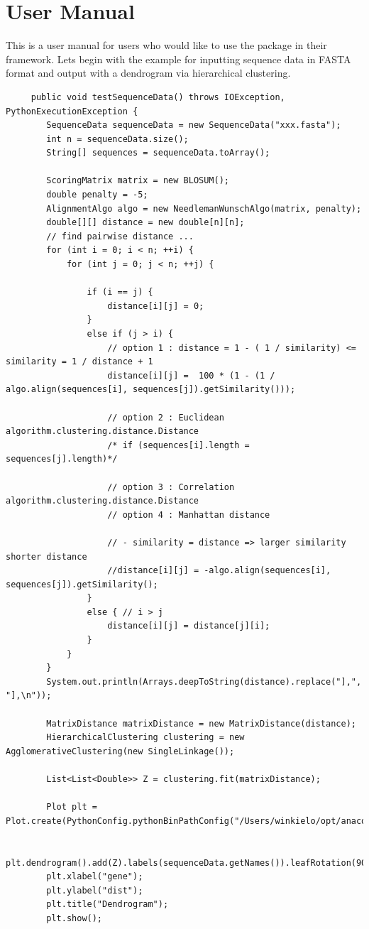 \documentclass[]{final_report}
\begin{document}
\chapter{User Manual}
This is a user manual for users who would like to use the package in their framework. Lets begin with the example for inputting sequence data in FASTA format and output with a dendrogram via hierarchical clustering.

\begin{verbatim}
     public void testSequenceData() throws IOException, PythonExecutionException {
        SequenceData sequenceData = new SequenceData("xxx.fasta");
        int n = sequenceData.size();
        String[] sequences = sequenceData.toArray();

        ScoringMatrix matrix = new BLOSUM();
        double penalty = -5;
        AlignmentAlgo algo = new NeedlemanWunschAlgo(matrix, penalty);
        double[][] distance = new double[n][n];
        // find pairwise distance ...
        for (int i = 0; i < n; ++i) {
            for (int j = 0; j < n; ++j) {

                if (i == j) {
                    distance[i][j] = 0;
                }
                else if (j > i) {
                    // option 1 : distance = 1 - ( 1 / similarity) <= similarity = 1 / distance + 1
                    distance[i][j] =  100 * (1 - (1 / algo.align(sequences[i], sequences[j]).getSimilarity()));

                    // option 2 : Euclidean algorithm.clustering.distance.Distance
                    /* if (sequences[i].length = sequences[j].length)*/

                    // option 3 : Correlation algorithm.clustering.distance.Distance
                    // option 4 : Manhattan distance

                    // - similarity = distance => larger similarity shorter distance
                    //distance[i][j] = -algo.align(sequences[i], sequences[j]).getSimilarity();
                }
                else { // i > j
                    distance[i][j] = distance[j][i];
                }
            }
        }
        System.out.println(Arrays.deepToString(distance).replace("],", "],\n"));

        MatrixDistance matrixDistance = new MatrixDistance(distance);
        HierarchicalClustering clustering = new AgglomerativeClustering(new SingleLinkage());

        List<List<Double>> Z = clustering.fit(matrixDistance);

        Plot plt = Plot.create(PythonConfig.pythonBinPathConfig("/Users/winkielo/opt/anaconda3/bin/python"));

        plt.dendrogram().add(Z).labels(sequenceData.getNames()).leafRotation(90);
        plt.xlabel("gene");
        plt.ylabel("dist");
        plt.title("Dendrogram");
        plt.show();
\end{verbatim}
\end{document}
